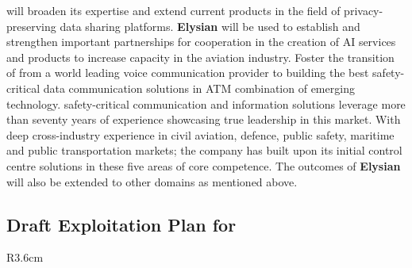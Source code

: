 \documentclass[a4paper,11pt]{article}
\newcommand{\project}[1]{\textbf{#1}\xspace}
\newcommand{\SECURITY}{\project{Elysian}}
\newcommand{\TheProject}{\SECURITY}
\begin{document}
\FRQlong{} will broaden its expertise and extend current products in the field of privacy-preserving data sharing platforms.
\TheProject{} will be used to establish and strengthen important partnerships for cooperation in the creation of AI services and products to increase capacity in the aviation industry. Foster the transition of \FRQlong{} from a world leading voice communication provider to building the best safety-critical data communication solutions in ATM combination of emerging technology.
\FRQlong{} safety-critical communication and information solutions leverage more than seventy years of experience showcasing true leadership in this market. With deep cross-industry experience in civil aviation, defence, public safety, maritime and public transportation markets; the company has built upon its initial control centre solutions in these five areas of core competence. The outcomes of \TheProject{} will also be extended to other domains as mentioned above.

\horizontalline

\subsection*{Draft Exploitation Plan for \YAGshort{}}
\vspace{-6pt}

\begin{wrapfigure}{R}{3.6cm}
\vspace{-1.3cm}
\hfill {}
\vspace{-0.8cm}
\end{wrapfigure}
\end{document}
